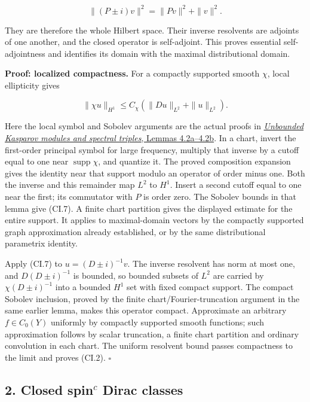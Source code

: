 \documentclass[
  11pt,
]{article}
\begin{document}
\[
 \|(P\pm i)v\|^2=\|Pv\|^2+\|v\|^2.
\]

They are therefore the whole Hilbert space. Their inverse resolvents are
adjoints of one another, and the closed operator is self-adjoint. This
proves essential self-adjointness and identifies its domain with the
maximal distributional domain.

\textbf{Proof: localized compactness.} For a compactly supported smooth
\(\chi\), local ellipticity gives

\[
 \|\chi u\|_{H^1}\leq C_\chi(\|Du\|_{L^2}+\|u\|_{L^2}).
 \tag{CI.7}
\]

Here the local symbol and Sobolev arguments are the actual proofs in
\href{KT-KK-11.html\#4-spectral-triples-and-the-circle}{\emph{Unbounded
Kasparov modules and spectral triples}, Lemmas 4.2a--4.2b}. In a chart,
invert the first-order principal symbol for large frequency, multiply
that inverse by a cutoff equal to one near \(\operatorname{supp}\chi\),
and quantize it. The proved composition expansion gives the identity
near that support modulo an operator of order minus one. Both the
inverse and this remainder map \(L^2\) to \(H^1\). Insert a second
cutoff equal to one near the first; its commutator with \(P\) is order
zero. The Sobolev bounds in that lemma give (CI.7). A finite chart
partition gives the displayed estimate for the entire support. It
applies to maximal-domain vectors by the compactly supported graph
approximation already established, or by the same distributional
parametrix identity.

Apply (CI.7) to \(u=(D\pm i)^{-1}v\). The inverse resolvent has norm at
most one, and \(D(D\pm i)^{-1}\) is bounded, so bounded subsets of
\(L^2\) are carried by \(\chi(D\pm i)^{-1}\) into a bounded \(H^1\) set
with fixed compact support. The compact Sobolev inclusion, proved by the
finite chart/Fourier-truncation argument in the same earlier lemma,
makes this operator compact. Approximate an arbitrary \(f\in C_0(Y)\)
uniformly by compactly supported smooth functions; such approximation
follows by scalar truncation, a finite chart partition and ordinary
convolution in each chart. The uniform resolvent bound passes
compactness to the limit and proves (CI.2). \(\square\)

\subsection{\texorpdfstring{2. Closed spin\(^{c}\) Dirac
classes}{2. Closed spin\^{}\{c\} Dirac classes}}\label{closed-spinc-dirac-classes}
\end{document}

